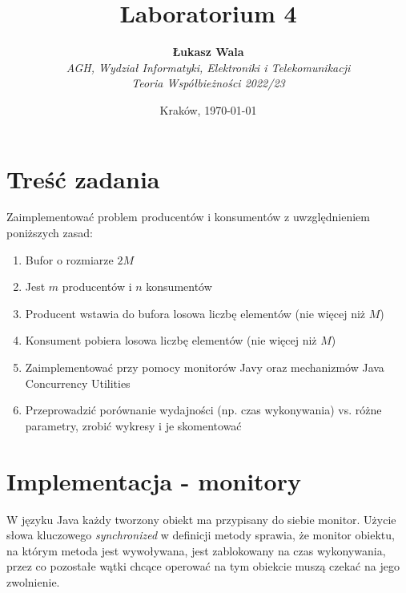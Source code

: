 \documentclass{article}
\title{Laboratorium 4}
\author{\textbf{Łukasz Wala}\\
    \textit{AGH, Wydział Informatyki, Elektroniki i Telekomunikacji} \\
    \textit{Teoria Współbieżności 2022/23}}
\date{Kraków, \today}
\begin{document}
\maketitle

\section{Treść zadania}
Zaimplementować problem producentów i konsumentów z uwzględnieniem poniższych
zasad:
\begin{enumerate}
    \item
    Bufor o rozmiarze $2M$
    \item
    Jest $m$ producentów i $n$ konsumentów
    \item
    Producent wstawia do bufora losowa liczbę elementów (nie więcej niż $M$)
    \item
    Konsument pobiera losowa liczbę elementów (nie więcej niż $M$)
    \item
    Zaimplementować przy pomocy monitorów Javy oraz mechanizmów Java Concurrency Utilities
    \item
    Przeprowadzić porównanie wydajności (np. czas wykonywania) vs. różne parametry, zrobić wykresy i je skomentować
\end{enumerate}

\section{Implementacja - monitory}

W języku Java każdy tworzony obiekt ma przypisany do siebie monitor. Użycie słowa kluczowego
\textit{synchronized} w definicji metody sprawia, że monitor obiektu, na którym metoda jest
wywoływana, jest zablokowany na czas wykonywania, przez co pozostałe wątki chcące operować na
tym obiekcie muszą czekać na jego zwolnienie.
\end{document}
